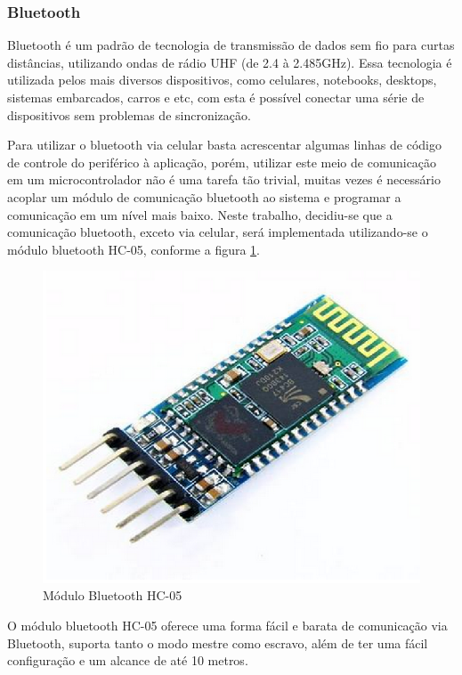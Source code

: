 \subsubsection{Bluetooth}

Bluetooth é um padrão de tecnologia de transmissão de dados sem fio para curtas distâncias, utilizando ondas de rádio UHF (de 2.4 à 2.485GHz). Essa tecnologia é utilizada pelos mais diversos dispositivos, como celulares, notebooks, desktops, sistemas embarcados, carros e etc, com esta é possível conectar uma série de dispositivos sem problemas de sincronização.

Para utilizar o bluetooth via celular basta acrescentar algumas linhas de código de controle do periférico à aplicação, porém, utilizar este meio de comunicação em um microcontrolador não é uma tarefa tão trivial, muitas vezes é necessário acoplar um módulo de comunicação bluetooth ao sistema e programar a comunicação em um nível mais baixo. Neste trabalho, decidiu-se que a comunicação bluetooth, exceto via celular, será implementada utilizando-se o módulo bluetooth HC-05, conforme a figura \ref{fig:bluetooth}.

\begin{figure}[!htb]
\centering
  \includegraphics[keepaspectratio=true,scale=0.5]{figuras/controle/bluetooth}
\caption{Módulo Bluetooth HC-05}
\label{fig:bluetooth}
\end{figure}

O módulo bluetooth HC-05 oferece uma forma fácil e barata de comunicação via Bluetooth, suporta tanto o modo mestre como escravo, além de ter uma fácil configuração e um alcance de até 10 metros.

